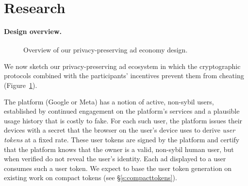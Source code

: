 \section{Research}
\label{r:stuff}

\paragraph{Design overview.}
%
%
%
%

\begin{figure}
 \centering
 \caption{Overview of our privacy-preserving ad economy design.}
 \label{f:overview}
\end{figure}

%
We now sketch our privacy-preserving ad ecosystem in which the cryptographic protocols combined with the participants' incentives prevent them from cheating (Figure~\ref{f:overview}).
%

%
The platform (\eg Google or Meta) has a notion of active, non-sybil users, established \eg by continued engagement on the platform's services and a plausible usage history that is costly to fake.
%
For each such user, the platform issues their devices with a secret that the browser on the user's device uses to derive \emph{user tokens} at a fixed rate.
%
These user tokens are signed by the platform and certify that the platform knows that the owner is a valid, non-sybil human user, but when verified do not reveal the user's identity.
%
Each ad displayed to a user consumes such a user token.
%
We expect to base the user token generation on existing work on compact tokens (see \S\ref{s:compacttokens}).
%

